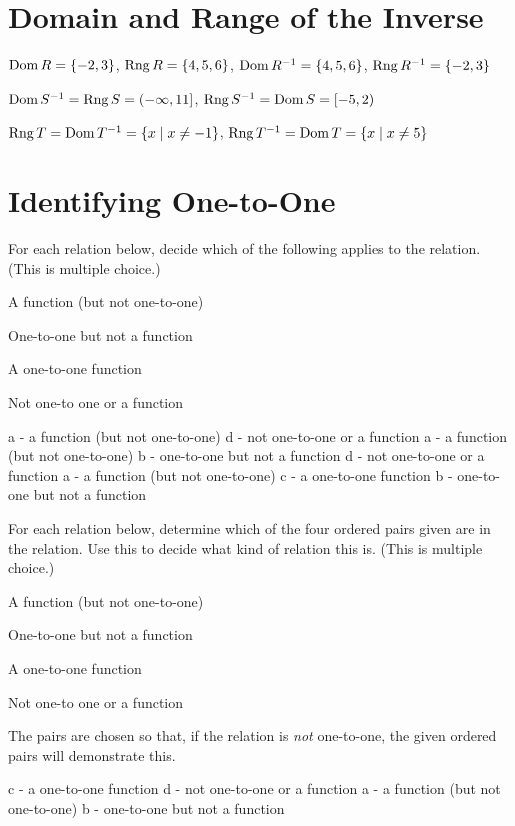 \section*{Domain and Range of the Inverse}
\begin{senum}
\item $\operatorname{Dom} R=\left\{-2,3\right\}$, $\operatorname{Rng} R=\left\{4,5,6\right\}$, $\operatorname{Dom} R^{-1}=\left\{4,5,6\right\}$, $\operatorname{Rng} R^{-1}=\left\{-2,3\right\}$
\item $\operatorname{Dom} S^{-1}=\operatorname{Rng} S=\left(-\infty,11\right]$, $\operatorname{Rng} S^{-1}=\operatorname{Dom} S=\left[-5,2\right)$
\item $\operatorname{Rng} T=\operatorname{Dom} T^{-1}=\left\{x\mid x\neq -1\right\}$, $\operatorname{Rng} T^{-1}=\operatorname{Dom} T=\left\{x\mid x\neq 5\right\}$
\end{senum}

\clearpage
\section*{Identifying One-to-One}
For each relation below, decide which of the following applies to the relation. (This is multiple choice.)
\begin{clist}
\item A function (but not one-to-one)
\item One-to-one but not a function
\item A one-to-one function
\item Not one-to one or a function
\end{clist}
\begin{smenum}
\mitemxx
{a - a function (but not one-to-one)}
{d - not one-to-one or a function}
\mitemxx
{a - a function (but not one-to-one)}
{b - one-to-one but not a function}
\mitemxx
{d - not one-to-one or a function}
{a - a function (but not one-to-one)}
\mitemxx
{c - a one-to-one function}
{b - one-to-one but not a function}
\end{smenum}
For each relation below, determine which of the four ordered pairs given are in the relation. Use this to decide what kind of relation this is. (This is multiple choice.)
\begin{clist}
\item A function (but not one-to-one)
\item One-to-one but not a function
\item A one-to-one function
\item Not one-to one or a function
\end{clist}
The pairs are chosen so that, if the relation is \emph{not} one-to-one, the given ordered pairs will demonstrate this.
\begin{smenum}
\mitemxx
{c - a one-to-one function}
{d - not one-to-one or a function}
\mitemxx
{a - a function (but not one-to-one)}
{b - one-to-one but not a function}
\end{smenum}

